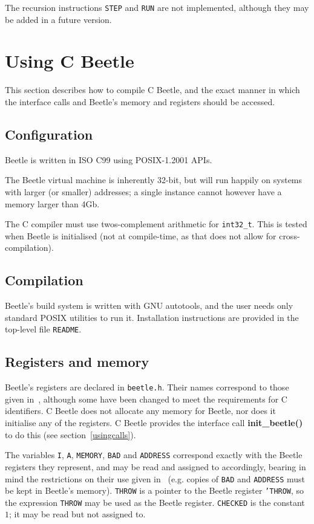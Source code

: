 \documentclass{article}
\begin{document}
The recursion instructions {\tt STEP} and {\tt RUN} are not implemented,
although they may be added in a future version.


\section{Using C Beetle}

This section describes how to compile C Beetle, and the exact manner in which
the interface calls and Beetle's memory and registers should be accessed.


\subsection{Configuration}
\label{configuration}

Beetle is written in ISO C99 using POSIX-1.2001 APIs.

The Beetle virtual machine is inherently 32-bit, but will run happily on systems with larger (or smaller) addresses; a single instance cannot however have a memory larger than 4Gb.

The C compiler must use twos-complement arithmetic for {\tt int32\_t}.
This is tested when Beetle is initialised (not at compile-time, as
that does not allow for cross-compilation).


\subsection{Compilation}

Beetle's build system is written with GNU autotools, and the user
needs only standard POSIX utilities to run it. Installation
instructions are provided in the top-level file {\tt README}.


\subsection{Registers and memory}

Beetle's registers are declared in {\tt beetle.h}. Their names correspond to
those given in~\cite[section~2.1]{beetle}, although some have been changed
to meet the requirements for C identifiers. C Beetle does not allocate any
memory for Beetle, nor does it initialise any of the registers. C Beetle
provides the interface call {\bf init\_beetle()} to do this (see
section~\ref{usingcalls}).

The variables {\tt I}, {\tt A}, {\tt MEMORY}, {\tt BAD} and {\tt ADDRESS}
correspond exactly with the Beetle registers they represent, and may be read
and assigned to accordingly, bearing in mind the restrictions on their use
given in~\cite{beetle} (e.g. copies of {\tt BAD} and {\tt ADDRESS} must be
kept in Beetle's memory). {\tt THROW} is a pointer to the Beetle register
{\tt 'THROW}, so the expression {\tt *THROW} may be used as the Beetle
register. {\tt CHECKED} is the constant $1$; it may be read but not
assigned to.
\end{document}
